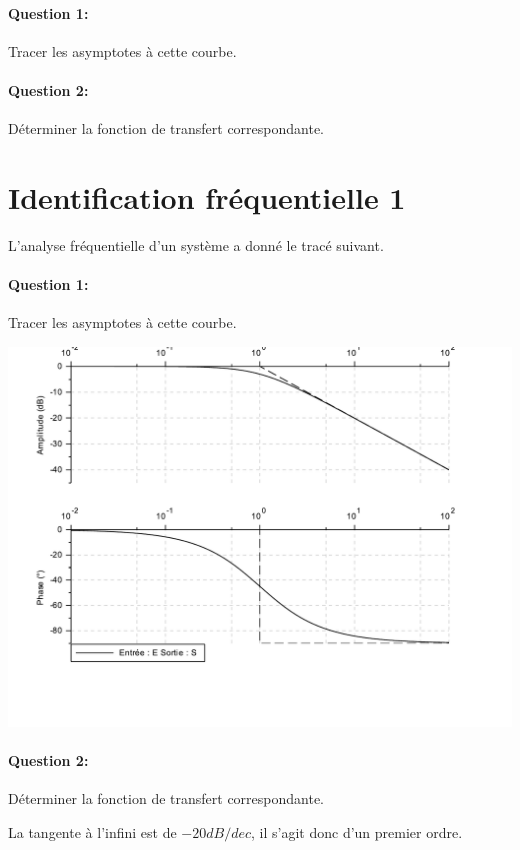 \paragraph{Question 1:} Tracer les asymptotes à cette courbe.

\paragraph{Question 2:} Déterminer la fonction de transfert correspondante.



\newpage

\pagestyle{correction}\setcounter{section}{0}

\section{Identification fréquentielle 1}

L'analyse fréquentielle d'un système a donné le tracé suivant.


\paragraph{Question 1:} Tracer les asymptotes à cette courbe.

\begin{center}
 \includegraphics[width=0.8\linewidth]{img/Bode1_c}
\end{center} 

\paragraph{Question 2:} Déterminer la fonction de transfert correspondante.

La tangente à l'infini est de $-20dB/dec$, il s'agit donc d'un premier ordre.

